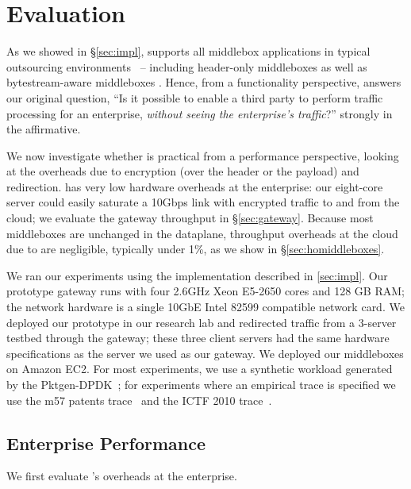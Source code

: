 
\section{Evaluation} \label{sec:eval}

As we showed in \S\ref{sec:impl}, \sys supports all middlebox applications in typical outsourcing environments~\cite{aplomb,nfv} -- including header-only middleboxes as well as bytestream-aware middleboxes . 
Hence, from a functionality perspective, \sys answers our original question, ``Is it possible to enable a third party to perform traffic processing for an enterprise, {\em without seeing the enterprise's traffic}?''  strongly in the affirmative.

We now investigate whether \sys is practical from a performance perspective, looking at the overheads due to encryption (over the header or the payload) and redirection. 
\sys has very low hardware overheads at the enterprise: our eight-core server could easily saturate a 10Gbps link with encrypted traffic to and from the cloud; we evaluate the gateway throughput in \S\ref{sec:gateway}.
Because most middleboxes are unchanged in the dataplane, throughput overheads at the cloud due to \sys are negligible, typically under 1\%, as we show in \S\ref{sec:homiddleboxes}.  

We ran our experiments using the implementation described in \ref{sec:impl}. 
Our prototype gateway runs with four 2.6GHz Xeon E5-2650 cores and 128 GB RAM; the network hardware is a single 10GbE Intel 82599 compatible network card.
We deployed our prototype in our research lab and redirected traffic from a 3-server testbed through the gateway; these three client servers had the same hardware specifications as the server we used as our gateway.
We deployed our middleboxes on Amazon EC2.
For most experiments, we use a synthetic workload generated by the Pktgen-DPDK~\cite{pktgen}; for experiments where an empirical trace is specified we use the m57 patents trace~\cite{m57} and the ICTF 2010 trace~\cite{ictf}.


\subsection{Enterprise Performance}
\label{sec:enterprise}
We first evaluate \sys's overheads at the enterprise. %


